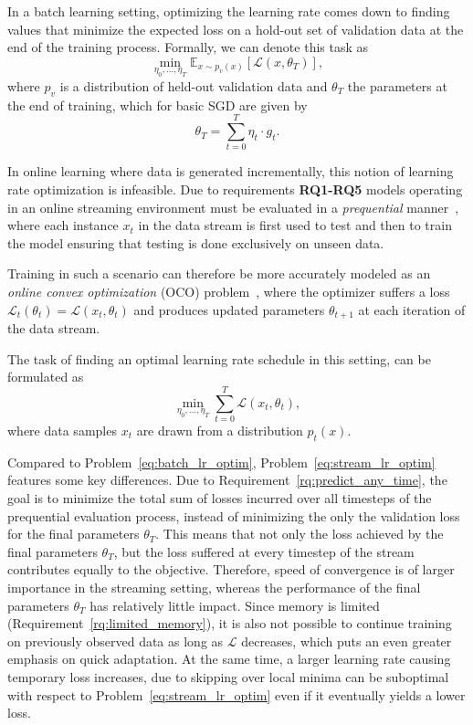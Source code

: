 \documentclass[letterpaper]{article} %
\begin{document}
In a batch learning setting, optimizing the learning rate comes down to finding values that minimize the expected loss on a hold-out set of validation data at the end of the training process.
Formally, we can denote this task as
\begin{equation}
	\label{eq:batch_lr_optim}
	\min_{\eta_0, \ldots, \eta_T} \mathbb{E}_{x \sim p_v(x)}[\mathcal{L}(x, \theta_T)],
\end{equation}
where $p_v$ is a distribution of held-out validation data and $\theta_T$ the parameters at the end of training, which for basic SGD are given by
\begin{equation}
	\theta_T = \sum_{t=0}^{T} \eta_t \cdot g_t.
\end{equation}

In online learning where data is generated incrementally, this notion of learning rate optimization is infeasible.
Due to requirements \textbf{RQ1-RQ5} models operating in an online streaming environment must be evaluated in a \textit{prequential} manner~\cite{bifetMOAMassiveOnline2010}, where each instance $x_t$ in the data stream is first used to test and then to train the model ensuring that testing is done exclusively on unseen data.

Training in such a scenario can therefore be more accurately modeled as an \textit{online convex optimization} (OCO) problem~\cite{shalev-shwartzOnlineLearningOnline2011,hazanIntroductionOnlineConvex2016}, where the optimizer suffers a loss $\mathcal{L}_t(\theta_t) = \mathcal{L}(x_t, \theta_{t})$ and produces updated parameters $\theta_{t+1}$ at each iteration of the data stream.

The task of finding an optimal learning rate schedule in this setting, can be formulated as
\begin{equation}
	\label{eq:stream_lr_optim}
	\min_{\eta_0, \ldots, \eta_T} \sum_{t=0}^{T} \mathcal{L}(x_t, \theta_t),
\end{equation}
where data samples $x_t$ are drawn from a distribution $p_t(x)$.

Compared to Problem~\eqref{eq:batch_lr_optim}, Problem~\eqref{eq:stream_lr_optim} features some key differences.
Due to Requirement~\ref{rq:predict_any_time}, the goal is to minimize the total sum of losses incurred over all timesteps of the prequential evaluation process,  instead of minimizing the only the validation loss for the final parameters $\theta_T$.
This means that not only the loss achieved by the final parameters $\theta_T$, but the loss suffered at every timestep of the stream contributes equally to the objective.
Therefore, speed of convergence is of larger importance in the streaming setting, whereas the performance of the final parameters $\theta_T$ has relatively little impact.
Since memory is limited (Requirement~\ref{rq:limited_memory}), it is also not possible to continue training on previously observed data as long as $\mathcal{L}$ decreases, which puts an even greater emphasis on quick adaptation.
At the same time, a larger learning rate causing temporary loss increases, due to skipping over local minima can be suboptimal with respect to Problem~\ref{eq:stream_lr_optim} even if it eventually yields a lower loss.
\end{document}
